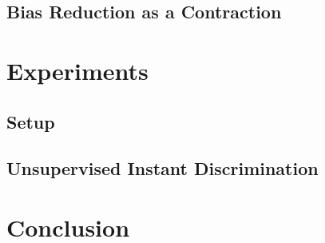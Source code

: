 \documentclass{article}
\begin{document}
\subsection{Bias Reduction as a Contraction}

\section{Experiments}
\subsection{Setup}

\subsection{Unsupervised Instant Discrimination}

\section{Conclusion}

 
\small{}

% 
\end{document}
